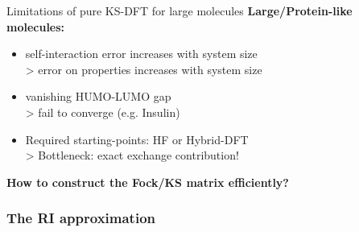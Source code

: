 \begin{frame}{Limitations of pure KS-DFT for large molecules}
  \textbf{Large/Protein-like molecules:}
  \begin{itemize}
  \item self-interaction error increases with system size 
    \\ > {\red error on properties increases with system size} 
  \item vanishing HUMO-LUMO gap \\ > {\red fail to converge} (e.g. Insulin)
  \item Required starting-points: HF or Hybrid-DFT \\> {\red Bottleneck: exact exchange contribution!}
  \end{itemize}


  \textbf{How to construct the Fock/KS matrix efficiently?}
  
  
\end{frame}

\frametitle{The RI approximation}
\framesubtitle{}

